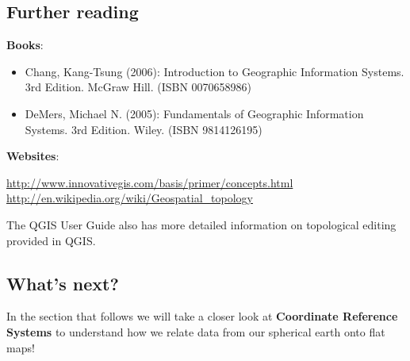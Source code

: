 \subsection{Further reading}

\textbf{Books}:

\begin{itemize}
\item Chang, Kang-Tsung (2006): Introduction to Geographic Information Systems. 3rd
Edition.  McGraw Hill. (ISBN 0070658986)
\item DeMers, Michael N. (2005): Fundamentals of Geographic Information Systems.
3rd Edition. Wiley. (ISBN 9814126195)
\end{itemize}

\textbf{Websites}:
 
\url{http://www.innovativegis.com/basis/primer/concepts.html} \\
\url{http://en.wikipedia.org/wiki/Geospatial\_topology}

The QGIS User Guide also has more detailed information on topological editing
provided in QGIS.

\subsection{What's next?}

In the section that follows we will take a closer look at \textbf{Coordinate
Reference Systems} to understand how we relate data from our spherical earth
onto flat maps!





